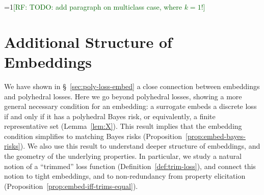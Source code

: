 \documentclass[twoside,11pt]{article}
\newcommand{\Comments}{1}
\newcommand{\mynote}[2]{\ifnum\Comments=1\textcolor{#1}{#2}\fi}
\newcommand{\raf}[1]{\mynote{darkgreen}{[RF: #1]}}
\newcommand{\jessie}[1]{\mynote{teal}{[JF: #1]}}
\newcommand{\prop}[1]{\mathrm{prop}[#1]}
\newcommand{\elltopk}{\ell^{\text{top-$k$}}}
\begin{document}



\raf{TODO: add paragraph on multiclass case, where $k=1$!}


\section{Additional Structure of Embeddings}
\label{sec:min-rep-sets}

We have shown in \S~\ref{sec:poly-loss-embed} a close connection between embeddings and polyhedral losses.
Here we go beyond polyhedral losses, showing a more general necessary condition for an embedding: a surrogate embeds a discrete loss if and only if it has a polyhedral Bayes risk, or equivalently, a finite representative set (Lemma~\ref{lem:X}).
This result implies that the embedding condition simplifies to matching Bayes risks (Proposition~\ref{prop:embed-bayes-risks}).
We also use this result to understand deeper structure of embeddings, and the geometry of the underlying properties. %
In particular, we study a natural notion of a ``trimmed'' loss function (Definition~\ref{def:trim-loss}), and connect this notion to tight embeddings, and to non-redundancy from property elicitation (Proposition~\ref{prop:embed-iff-trims-equal}).
 
\end{document}
